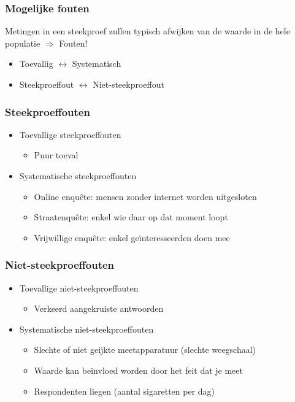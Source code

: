 \documentclass[aspectratio=169]{beamer}
\begin{document}
\begin{frame}
  \frametitle{Mogelijke fouten}
  
  Metingen in een steekproef zullen typisch afwijken van de waarde in de hele populatie $\Rightarrow$ Fouten!
  
  \bigskip
  
  \begin{itemize}
    \item Toevallig $\leftrightarrow$ Systematisch
    \item Steekproeffout $\leftrightarrow$ Niet-steekproeffout
  \end{itemize}
\end{frame}

\begin{frame}
  \frametitle{Steekproeffouten}

  \begin{itemize}
    \item<+-> Toevallige steekproeffouten
      \begin{itemize}
        \item Puur toeval
      \end{itemize}
    \item<+-> Systematische steekproeffouten
      \begin{itemize}
        \item Online enquête: mensen zonder internet worden uitgesloten
        \item Straatenquête: enkel wie daar op dat moment loopt
        \item Vrijwillige enquête: enkel geïnteresseerden doen mee
      \end{itemize}
  \end{itemize}
 \end{frame}

\begin{frame}
\frametitle{Niet-steekproeffouten}
  \begin{itemize}
    \item<+-> Toevallige niet-steekproeffouten
      \begin{itemize}
        \item Verkeerd aangekruiste antwoorden
      \end{itemize}
    \item<+-> Systematische niet-steekproeffouten
      \begin{itemize}
        \item Slechte of niet geijkte meetapparatuur (slechte weegschaal)
        \item Waarde kan beïnvloed worden door het feit dat je meet
        \item Respondenten liegen (aantal sigaretten per dag)
      \end{itemize}
  \end{itemize}
\end{frame}
\end{document}
